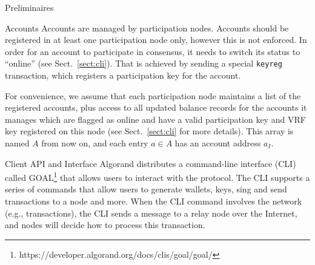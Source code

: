 \documentclass[10pt,a4paper]{article}
\begin{document}
\begin{section}{Preliminaires}
\begin{subsection}{Accounts}
Accounts are managed by participation nodes. Accounts should be registered in at least one participation
node only, however this is not enforced.
In order for an account to participate in consensus, it needs to switch its status to ``online''
(see Sect.~\ref{sect:cli}). 
That is achieved by sending a special {\tt keyreg} transaction,
which registers a participation key for the account.%

For convenience, we assume that each participation node maintains a list 
of the registered accounts, plus access to all updated balance records for 
the accounts it manages which are flagged as online and have a valid 
participation key and VRF key registered on this node (see Sect.~\ref{sect:cli}
for more details).
This array is named $A$ from now on, and each entry $a\in A$ has an account address 
$a_I$. %

\end{subsection}
\begin{subsection}{Client API and Interface}\label{sect:cli}
    Algorand distributes a command-line interface (CLI) called GOAL\footnote{https://developer.algorand.org/docs/clis/goal/goal/} 
    that allows users to interact with the protocol. The CLI supports a series of commands 
    that allow users to generate  wallets, keys, sing and send transactions to 
    a node and more.
    When the CLI command involves the network (e.g., transactions), the CLI
    sends a message to a relay node over the Internet, and nodes will decide
    how to process this transaction.


\end{subsection}
\end{section}
\end{document}
